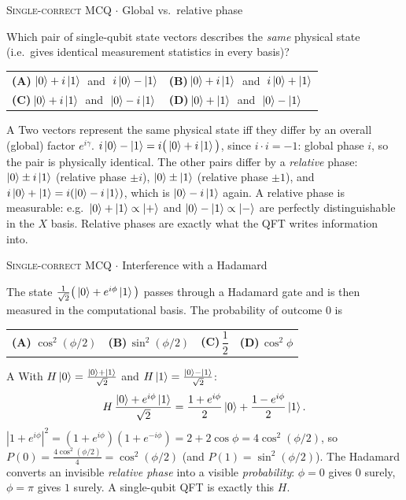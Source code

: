 \documentclass[11pt,a4paper]{article}
\newcommand{\optlabel}[1]{\textbf{(#1)}}
\newcommand{\correctlabel}[1]{\textcolor{okgreen}{\textbf{(#1)}\,\ding{51}}}
\newenvironment{qitem}[1]{\begin{list}{}{\setlength{\leftmargin}{3.3em}\setlength{\labelwidth}{3.1em}%
  \setlength{\labelsep}{0.2em}\setlength{\topsep}{3pt}\setlength{\parsep}{3pt}}\item[\textbf{Q.#1}\hfill]}{\end{list}}
\newcommand{\qsep}{\par\vspace{2pt}{\color{black!15}\hrule}\vspace{4pt}}
\newcommand{\qmeta}[2]{{\footnotesize\color{black!60}\textsc{#1} \;$\cdot$\; #2}\par}
\begin{document}
\begin{qitem}{22}
\qmeta{Single-correct MCQ}{Global vs.\ relative phase}
Which pair of single-qubit state vectors describes the \emph{same} physical state (i.e.\ gives identical
measurement statistics in every basis)?
\par\smallskip\noindent\begin{tabularx}{\linewidth}{@{}*{2}{L}@{}}
\correctlabel{A}\,$\ket{0} + i\ket{1}\;$ and $\;i\ket{0} - \ket{1}$ & \optlabel{B}\,$\ket{0} + i\ket{1}\;$ and $\;i\ket{0} + \ket{1}$ \\[3pt]
\optlabel{C}\,$\ket{0} + i\ket{1}\;$ and $\;\ket{0} - i\ket{1}$ & \optlabel{D}\,$\ket{0} + \ket{1}\;$ and $\;\ket{0} - \ket{1}$
\end{tabularx}
\end{qitem}
\begin{solbox}{A}
Two vectors represent the same physical state iff they differ by an overall (global) factor $e^{i\gamma}$.
$i\ket{0} - \ket{1} = i\big(\ket{0} + i\ket{1}\big)$, since $i\cdot i = -1$: global phase $i$, so the pair is physically identical.
The other pairs differ by a \emph{relative} phase: $\ket{0} \pm i\ket{1}$ (relative phase $\pm i$), $\ket{0} \pm \ket{1}$
(relative phase $\pm1$), and $i\ket{0} + \ket{1} = i(\ket{0} - i\ket{1})$, which is $\ket{0} - i\ket{1}$ again.
A relative phase is measurable: e.g.\ $\ket{0}+\ket{1} \propto \ket{+}$ and $\ket{0} - \ket{1} \propto \ket{-}$ are perfectly
distinguishable in the $X$ basis. Relative phases are exactly what the QFT writes information into.
\end{solbox}
\qsep

\begin{qitem}{23}
\qmeta{Single-correct MCQ}{Interference with a Hadamard}
The state $\frac{1}{\sqrt2}\big(\ket{0} + e^{i\phi}\ket{1}\big)$ passes through a Hadamard gate and is then measured
in the computational basis. The probability of outcome $0$ is
\par\smallskip\noindent\begin{tabularx}{\linewidth}{@{}*{4}{L}@{}}
\correctlabel{A}\,$\cos^2(\phi/2)$ & \optlabel{B}\,$\sin^2(\phi/2)$ & \optlabel{C}\,$\dfrac12$ & \optlabel{D}\,$\cos^2\phi$
\end{tabularx}
\end{qitem}
\begin{solbox}{A}
With $H\ket{0} = \frac{\ket0 + \ket1}{\sqrt2}$ and $H\ket{1} = \frac{\ket0 - \ket1}{\sqrt2}$:
\[ H\,\frac{\ket{0} + e^{i\phi}\ket{1}}{\sqrt2} = \frac{1 + e^{i\phi}}{2}\ket{0} + \frac{1 - e^{i\phi}}{2}\ket{1}. \]
$|1 + e^{i\phi}|^2 = (1 + e^{i\phi})(1 + e^{-i\phi}) = 2 + 2\cos\phi = 4\cos^2(\phi/2)$, so
$P(0) = \frac{4\cos^2(\phi/2)}{4} = \cos^2(\phi/2)$ (and $P(1) = \sin^2(\phi/2)$).
The Hadamard converts an invisible \emph{relative phase} into a visible \emph{probability}: $\phi = 0$ gives $0$ surely,
$\phi = \pi$ gives $1$ surely. A single-qubit QFT is exactly this $H$.
\end{solbox}
\qsep
\end{document}

